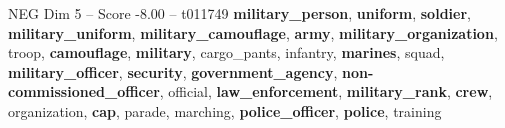 \begin{textsample}{NEG Dim 5 – Score -8.00 – t011749}  \label{ex:f5_neg_007}
\textbf{military\_person}, \textbf{uniform}, \textbf{soldier}, \textbf{military\_uniform}, \textbf{military\_camouflage}, \textbf{army}, \textbf{military\_organization}, troop, \textbf{camouflage}, \textbf{military}, cargo\_pants, infantry, \textbf{marines}, squad, \textbf{military\_officer}, \textbf{security}, \textbf{government\_agency}, \textbf{non-commissioned\_officer}, official, \textbf{law\_enforcement}, \textbf{military\_rank}, \textbf{crew}, organization, \textbf{cap}, parade, marching, \textbf{police\_officer}, \textbf{police}, training

\end{textsample}
